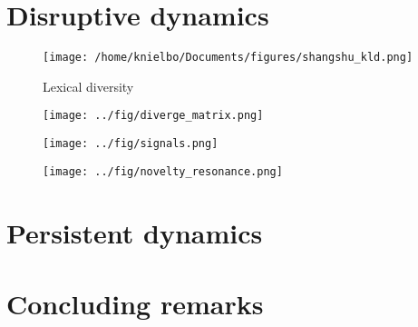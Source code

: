 \section{Disruptive dynamics}
\begin{frame}
\begin{figure}
	\centering
	\texttt{[image: /home/knielbo/Documents/figures/shangshu\_kld.png]}
	\caption{Lexical diversity}
\end{figure}
\end{frame}



\begin{frame}
\begin{figure}
	\centering
	\texttt{[image: ../fig/diverge\_matrix.png]}
	\caption{}
\end{figure}
\end{frame}

\begin{frame}
\begin{figure}
	\centering
	\texttt{[image: ../fig/signals.png]}
	\caption{}
\end{figure}
\begin{figure}
	\centering
	\texttt{[image: ../fig/novelty\_resonance.png]}
	\caption{}
\end{figure}
\end{frame}


\section{Persistent dynamics}


\section{Concluding remarks}




